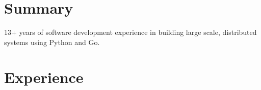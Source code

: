 \documentclass[margin,line]{resume}
\begin{document}
\address{github.com/nadeemsyed $\bullet$ (213) 985-6803 $\bullet$ snadeem.hameed@gmail.com $\bullet$ linkedin.com/in/nadeem-syed} 
\begin{resume}
\section{Summary}

{\small 13+ years of software development experience in building large scale, distributed systems using Python and Go.
}

\section{Experience}


\end{resume}
\end{document}
